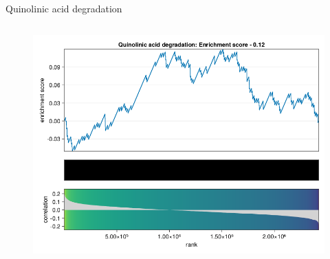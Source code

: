 \begin{frame}{Quinolinic acid degradation}
    \begin{columns}[c] %

        \begin{figure}
            \includegraphics[width=1\linewidth]{../figures/fsea_Quinolinic-acid-degradation.png}
        \end{figure}

    \end{columns}

\end{frame}

